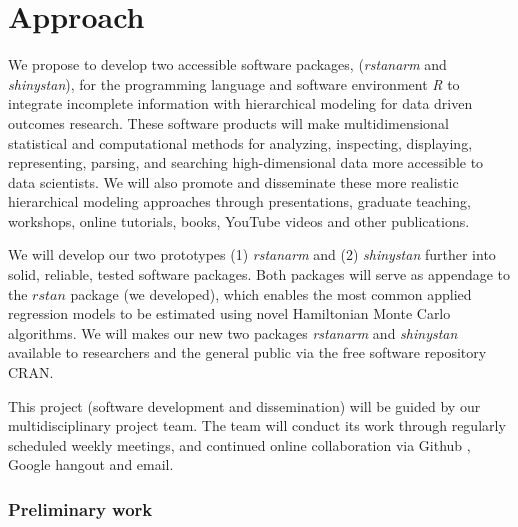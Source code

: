 \documentclass[11pt,notitlepage]{article}
\begin{document}
\part*{Approach}

We propose to develop two accessible software packages, (\textit{rstanarm} 
and \textit{shinystan}), for the programming language and software environment 
\textit{R} to integrate incomplete information with hierarchical modeling for 
data driven outcomes research. These software products will make multidimensional statistical and computational methods for analyzing, inspecting, displaying, 
representing, parsing, and searching high-dimensional data more accessible to 
data scientists. We will also promote and disseminate these more realistic 
hierarchical modeling approaches through presentations, graduate teaching, 
workshops, online tutorials, books, YouTube videos and other publications.

We will develop our two prototypes (1) \textit{rstanarm} and (2) 
\textit{shinystan} further into solid, reliable, tested software packages. 
Both packages will serve as appendage to the $rstan$ package (we developed), 
which enables the most common applied regression models to be estimated using 
novel Hamiltonian Monte Carlo algorithms. We will makes our new two 
packages \textit{rstanarm} and \textit{shinystan} available to researchers 
and the general public via the free software repository CRAN. 

This project (software development and dissemination) will be guided by 
our multidisciplinary project team. The team will conduct its work through 
regularly scheduled weekly meetings, and continued online collaboration via 
Github \cite{Chacon2009ProGit}, Google hangout and email. 



\section*{Preliminary work}
\end{document}
